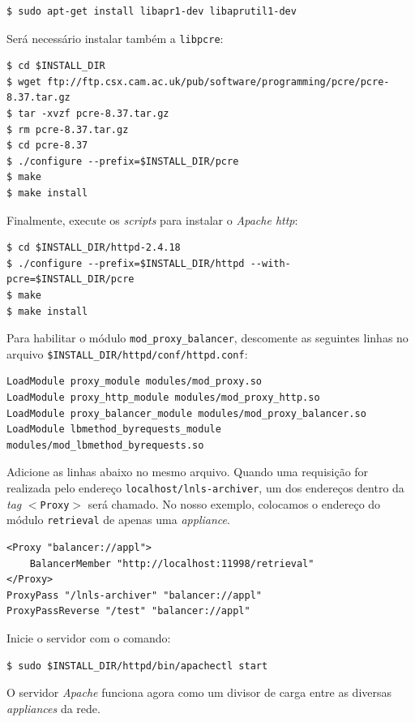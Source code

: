 \begin {enumerate}[i.]
\begin{lstlisting}[keywordstyle=\ttfamily, style=nonumbers]
$ sudo apt-get install libapr1-dev libaprutil1-dev
\end{lstlisting}

Será necessário instalar também a \texttt{libpcre}:

\begin{lstlisting}[keywordstyle=\ttfamily, style=nonumbers]
$ cd $INSTALL_DIR
$ wget ftp://ftp.csx.cam.ac.uk/pub/software/programming/pcre/pcre-8.37.tar.gz
$ tar -xvzf pcre-8.37.tar.gz
$ rm pcre-8.37.tar.gz
$ cd pcre-8.37
$ ./configure --prefix=$INSTALL_DIR/pcre
$ make
$ make install
\end{lstlisting}

Finalmente, execute os \textit{scripts} para instalar o \textit{Apache http}:

\begin{lstlisting}[keywordstyle=\ttfamily, style=nonumbers]
$ cd $INSTALL_DIR/httpd-2.4.18
$ ./configure --prefix=$INSTALL_DIR/httpd --with-pcre=$INSTALL_DIR/pcre
$ make
$ make install
\end{lstlisting}

Para habilitar o módulo \texttt{mod\_proxy\_balancer}, descomente as seguintes
linhas no arquivo \texttt{\$INSTALL\_DIR/httpd/conf/httpd.conf}:

\begin{lstlisting}[keywordstyle=\ttfamily, style=nonumbers]
LoadModule proxy_module modules/mod_proxy.so
LoadModule proxy_http_module modules/mod_proxy_http.so
LoadModule proxy_balancer_module modules/mod_proxy_balancer.so
LoadModule lbmethod_byrequests_module modules/mod_lbmethod_byrequests.so
\end{lstlisting}

Adicione as linhas abaixo no mesmo arquivo. Quando uma requisição for realizada
pelo endereço \texttt{localhost/lnls-archiver}, um dos endereços dentro da
\textit{tag} \texttt{\(<\)Proxy\(>\)} será chamado. No nosso exemplo, colocamos
o endereço do módulo \texttt{retrieval} de apenas uma \textit{appliance}.

\begin{lstlisting}[keywordstyle=\ttfamily, style=nonumbers]
<Proxy "balancer://appl">
    BalancerMember "http://localhost:11998/retrieval"
</Proxy>
ProxyPass "/lnls-archiver" "balancer://appl"
ProxyPassReverse "/test" "balancer://appl"
\end{lstlisting}

Inicie o servidor com o comando:

\begin{lstlisting}[keywordstyle=\ttfamily, style=nonumbers]
$ sudo $INSTALL_DIR/httpd/bin/apachectl start
\end{lstlisting}

O servidor \textit{Apache} funciona agora como um divisor de carga entre as
diversas \textit{appliances} da rede.

\end{enumerate} 

